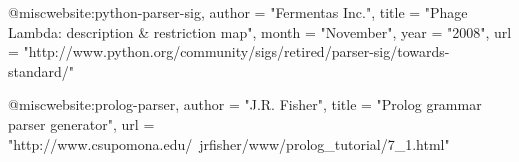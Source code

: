 @misc{website:python-parser-sig,
      author = "Fermentas Inc.",
      title = "Phage Lambda: description \& restriction map",
      month = "November",
      year = "2008",
      url = "http://www.python.org/community/sigs/retired/parser-sig/towards-standard/"
}

@misc{website:prolog-parser,
      author = "J.R. Fisher",
      title = "Prolog grammar parser generator",
      url = "http://www.csupomona.edu/~jrfisher/www/prolog_tutorial/7_1.html"
}